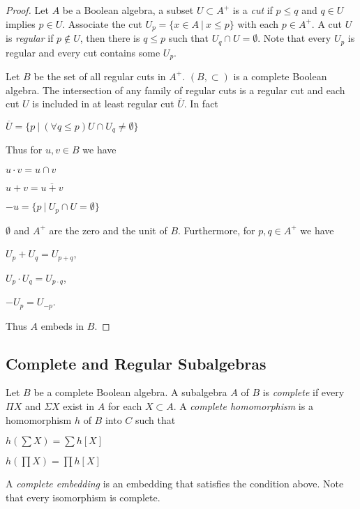 \documentclass[8pt]{article}
\theoremstyle{definition}
\theoremstyle{definition}
\theoremstyle{definition}
\theoremstyle{definition}
\theoremstyle{definition}
\theoremstyle{definition}
\theoremstyle{definition}
\theoremstyle{definition}
\theoremstyle{definition}
\theoremstyle{definition}
\theoremstyle{definition}
\theoremstyle{definition}
\theoremstyle{definition}
\theoremstyle{definition}
\theoremstyle{question}
\begin{document}
\begin{proof}
  Let $A$ be a Boolean algebra, a subset $U \subset A^+$ is a \emph{cut} if $p \leq q$ and $q \in U$ implies $p \in U$.
  Associate the cut $U_p = \{ x \in A \: | \: x \leq p \}$ with each $p \in A^+$.
  A cut $U$ is \emph{regular} if $p \notin U$, then there is $q \leq p$ such that $U_q \cap U = \emptyset$.
  Note that every $U_p$ is regular and every cut contains some $U_p$.

  Let $B$ be the set of all regular cuts in $A^+$. $(B, \subset)$ is a complete Boolean algebra.
  The intersection of any family of regular cuts is a regular cut and each cut $U$ is included in at least
  regular cut $\overline{U}$. In fact
  \begin{center}
    $\overline{U} = \{ p \: | \: (\forall q \leq p) U \cap U_q \neq \emptyset \}$
  \end{center}

  Thus for $u, v \in B$ we have
  \begin{center}
    $u \cdot v = u \cap v$

    $u + v = \overline{u + v}$

    $-u = \{ p \: | \: U_p \cap U = \emptyset \}$
  \end{center}
  $\emptyset$ and $A^+$ are the zero and the unit of $B$. Furthermore, for $p, q \in A^{+}$ we have

  \begin{center}
    $U_p + U_q = U_{p + q}$,

    $U_p \cdot U_q = U_{p \cdot q}$,

    $-U_p = U_{-p}$.
  \end{center}
  Thus $A$ embeds in $B$.
\end{proof}

\subsection{Complete and Regular Subalgebras}

Let $B$ be a complete Boolean algebra. A subalgebra $A$ of $B$ is \emph{complete} if every $\Pi X$ and $\Sigma X$ exist
in $A$ for each $X \subset A$. A \emph{complete homomorphism} is a homomorphism $h$ of $B$ into $C$ such that
\begin{center}
  $h(\sum X) = \sum h[X]$

  $h(\prod X) = \prod h[X]$
\end{center}
A \emph{complete embedding} is an embedding that satisfies the condition above. Note that every isomorphism is complete.
\end{document}
